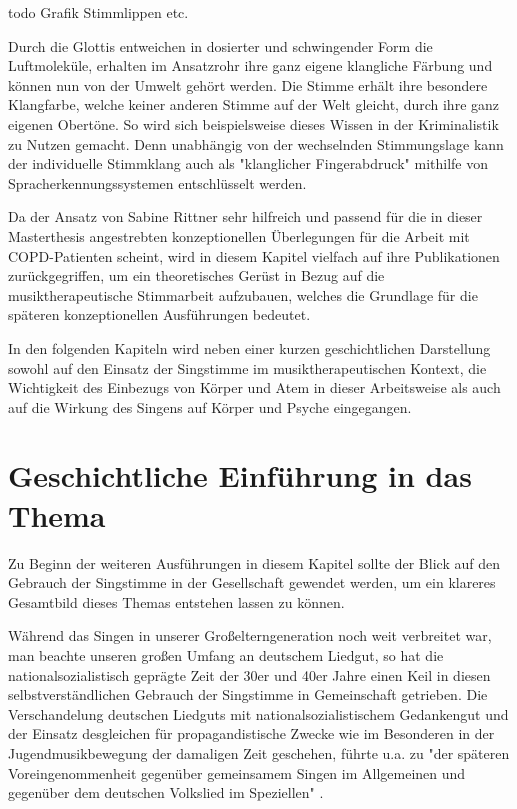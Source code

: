 todo Grafik Stimmlippen etc.

Durch die Glottis entweichen in dosierter und schwingender Form die Luftmoleküle, erhalten im Ansatzrohr ihre ganz eigene klangliche Färbung und können nun von der Umwelt gehört werden. Die Stimme erhält ihre besondere Klangfarbe, welche keiner anderen Stimme auf der Welt gleicht, durch ihre ganz eigenen Obertöne. So wird sich beispielsweise dieses Wissen in der Kriminalistik zu Nutzen gemacht. Denn unabhängig von der wechselnden Stimmungslage kann der individuelle Stimmklang auch als "klanglicher Fingerabdruck" \autocite[482]{rittner2009a} mithilfe von Spracherkennungssystemen entschlüsselt werden. 

Da der Ansatz von Sabine Rittner sehr hilfreich und passend für die in dieser Masterthesis angestrebten konzeptionellen Überlegungen für die Arbeit mit COPD-Patienten scheint, wird in diesem Kapitel vielfach auf ihre Publikationen zurückgegriffen, um ein theoretisches Gerüst in Bezug auf die musiktherapeutische Stimmarbeit aufzubauen, welches die Grundlage für die späteren konzeptionellen Ausführungen bedeutet.

In den folgenden Kapiteln wird neben einer kurzen geschichtlichen Darstellung sowohl auf den Einsatz der Singstimme im musiktherapeutischen Kontext, die Wichtigkeit des Einbezugs von Körper und Atem in dieser Arbeitsweise als auch auf die Wirkung des Singens auf Körper und Psyche eingegangen.

\section{Geschichtliche Einführung in das Thema}
Zu Beginn der weiteren Ausführungen in diesem Kapitel sollte der Blick auf den Gebrauch der Singstimme in der Gesellschaft gewendet werden, um ein klareres Gesamtbild dieses Themas entstehen lassen zu können.

Während das Singen in unserer Großelterngeneration noch weit verbreitet war, man beachte unseren großen Umfang an deutschem Liedgut, so hat die nationalsozialistisch geprägte Zeit der 30er und 40er Jahre einen Keil in diesen selbstverständlichen Gebrauch der Singstimme in Gemeinschaft getrieben.
Die Verschandelung deutschen Liedguts mit nationalsozialistischem Gedankengut und der Einsatz desgleichen für propagandistische Zwecke wie im Besonderen in der Jugendmusikbewegung der damaligen Zeit geschehen, führte u.a. zu "der späteren Voreingenommenheit gegenüber gemeinsamem Singen im Allgemeinen und gegenüber dem deutschen Volkslied im Speziellen" \autocite[9]{wolf2012}.

